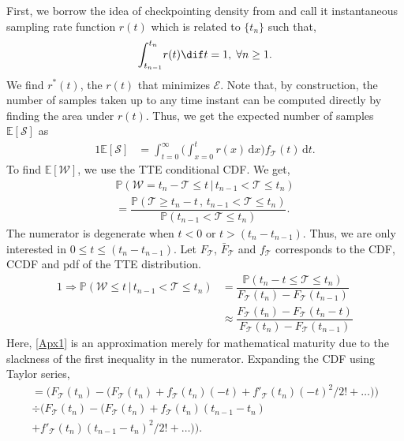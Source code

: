 First, we borrow the idea of checkpointing density from \textcite{CP_C} and call it instantaneous sampling rate function $r(t)$ which is
related to $\{t_n\}$ such that,
\begin{alignat}{1}
{\int_{t_{n-1}}^{t_n}}r(t)\dif t=1,\;\forall n\geq1.\label{rt}
\end{alignat}
We find $r^*(t)$, the $r(t)$ that minimizes $\mathcal{E}$.
Note that, by construction, the number of samples taken up to any time instant can be computed directly by finding the area under $r(t)$.
Thus, we get the expected number of samples $\mathbb{E}[\mathcal{S}]$ as
\begin{alignat}{1}
\mathbb{E}[\mathcal{S}]&=\int_{t=0}^{\infty}\bigg(\!\int_{x=0}^{t}\!\!\!\!r(x)\,\mathrm{d}x\bigg)f_{\mathcal{T}}(t)\,\mathrm{d}t.\label{Es}
\end{alignat}
To find 
$\mathbb{E}[\mathcal{W}]$, we use the TTE conditional CDF.
We get,
\begin{multline*}
\mathbb{P}(\mathcal{W}=t_n-\mathcal{T}\leq t\,\big\vert\,t_{n-1}<\mathcal{T}\leq t_n)\\=\dfrac{\mathbb{P}(\mathcal{T}\geq t_n-t\,,\,t_{n-1}<\mathcal{T}\leq t_n)}{\mathbb{P}(t_{n-1}<\mathcal{T}\leq t_n)}.
\end{multline*}
The numerator is degenerate when $t\!<\!0$ or $t\!>\!(t_n\!-\!t_{n-1})$.
Thus, we are only interested in $0\!\leq\!t\!\leq\! (t_n-t_{n-1})$.
Let $F_{\mathcal{T}}$, $\bar{F}_{\mathcal{T}}$ and $f_{\mathcal{T}}$ corresponds to the CDF, CCDF and pdf of the TTE distribution.
\begin{alignat*}{1}
\!\!\!\Rightarrow\mathbb{P}(\mathcal{W}\leq t\,\big\vert\,t_{n-1}<\mathcal{T}\leq t_n)&=\dfrac{\mathbb{P}(t_n-t\leq\mathcal{T}\leq t_n)}{F_\mathcal{T}(t_n)-F_\mathcal{T}(t_{n-1})}\\
&\approx\dfrac{F_\mathcal{T}(t_n)-F_\mathcal{T}(t_{n}-t)}{F_\mathcal{T}(t_n)-F_\mathcal{T}(t_{n-1})}\tag{$A_1$}\label{Apx1}
\end{alignat*}
Here, \ref{Apx1} is an approximation merely for mathematical maturity due to the slackness of the first inequality in the numerator.
Expanding the CDF using Taylor series, 
\begin{multline*}
    =\Big(F_\mathcal{T}(t_n)-\big(F_\mathcal{T}(t_n)+f_\mathcal{T}(t_n)(-t)+f'_\mathcal{T}(t_n)(-t)^2/2!+\dots\big)\Big)\\
    \div \Big(F_\mathcal{T}(t_n)-\big(F_\mathcal{T}(t_n)+f_\mathcal{T}(t_n)(t_{n-1}-t_n)\\+f'_\mathcal{T}(t_n)(t_{n-1}-t_n)^2/2!+\dots\big)\Big).
\end{multline*}
